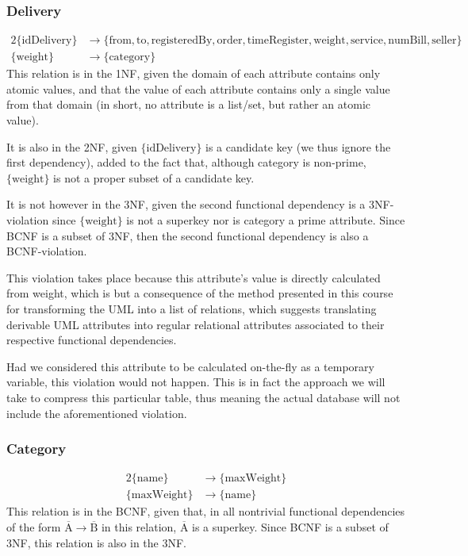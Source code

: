 \documentclass{report}[a4paper]
\theoremstyle{remark}
\begin{document}
\subsubsection{Delivery}
\begin{alignat*}{2}
\{\text{idDelivery}\} &\rightarrow \{\text{from},\text{to},\text{registeredBy},\text{order},\text{timeRegister},\text{weight},\text{service},\text{numBill},\text{seller}\} \\
\{\text{weight}\} &\rightarrow \{\text{category}\}
\end{alignat*}
This relation is in the 1NF, given the domain of each attribute contains only atomic values, and that the value of each attribute contains only a single value from that domain (in short, no attribute is a list/set, but rather an atomic value).\par
It is also in the 2NF, given $\{\text{idDelivery}\}$ is a candidate key (we thus ignore the first dependency), added to the fact that, although category is non-prime, $\{\text{weight}\}$ is not a proper subset of a candidate key. \par
It is not however in the 3NF, given the second functional dependency is a 3NF-violation since $\{\text{weight}\}$ is not a superkey nor is category a prime attribute. Since BCNF is a subset of 3NF, then the second functional dependency is also a BCNF-violation.\par
This violation takes place because this attribute's value is directly calculated from weight, which is but a consequence of the method presented in this course for transforming the UML into a list of relations, which suggests translating derivable UML attributes into regular relational attributes associated to their respective functional dependencies. \par
Had we considered this attribute to be calculated on-the-fly as a temporary variable, this violation would not happen. This is in fact the approach we will take to compress this particular table, thus meaning the actual database will not include the aforementioned violation.
\subsubsection{Category}
\begin{alignat*}{2}
\{\text{name}\} & \rightarrow \{\text{maxWeight}\} \\
\{\text{maxWeight}\} & \rightarrow \{\text{name}\}
\end{alignat*}
This relation is in the BCNF, given that, in all nontrivial functional dependencies of the form $\overline{\text{A}} \rightarrow \overline{\text{B}}$ in this relation, $\overline{\text{A}}$ is a superkey. Since BCNF is a subset of 3NF, this relation is also in the 3NF.
\end{document}
